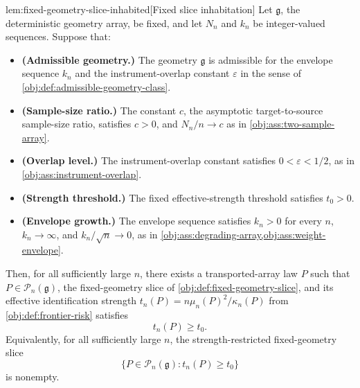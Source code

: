 \documentclass[11pt]{article}
\begin{document}
\begin{lemmav}{lem:fixed-geometry-slice-inhabited}[Fixed slice inhabitation]
Let \(\mathfrak g\), the deterministic geometry array, be fixed, and let \(N_n\) and \(k_n\) be integer-valued sequences. Suppose that:
\begin{itemize}
\item \textbf{(Admissible geometry.)} The geometry \(\mathfrak g\) is admissible for the envelope sequence \(k_n\) and the instrument-overlap constant \(\varepsilon\) in the sense of \cref{obj:def:admissible-geometry-class}.
\item \textbf{(Sample-size ratio.)} The constant \(c\), the asymptotic target-to-source sample-size ratio, satisfies \(c>0\), and \(N_n/n\to c\) as in \cref{obj:ass:two-sample-array}.
\item \textbf{(Overlap level.)} The instrument-overlap constant satisfies \(0<\varepsilon<1/2\), as in \cref{obj:ass:instrument-overlap}.
\item \textbf{(Strength threshold.)} The fixed effective-strength threshold satisfies \(t_0>0\).
\item \textbf{(Envelope growth.)} The envelope sequence satisfies \(k_n>0\) for every \(n\), \(k_n\to\infty\), and \(k_n/\sqrt n\to0\), as in \cref{obj:ass:degrading-array,obj:ass:weight-envelope}.
\end{itemize}
Then, for all sufficiently large \(n\), there exists a transported-array law \(P\) such that \(P\in\mathcal P_n(\mathfrak g)\), the fixed-geometry slice of \cref{obj:def:fixed-geometry-slice}, and its effective identification strength \(t_n(P)=n\mu_n(P)^2/\kappa_n(P)\) from \cref{obj:def:frontier-risk} satisfies
\[
t_n(P)\ge t_0 .
\]
Equivalently, for all sufficiently large \(n\), the strength-restricted fixed-geometry slice
\[
\{P\in\mathcal P_n(\mathfrak g): t_n(P)\ge t_0\}
\]
is nonempty.
\end{lemmav}
\end{document}

